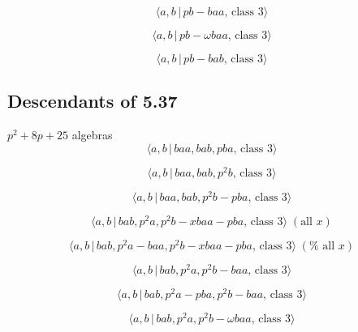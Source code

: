 \documentclass[10pt]{article}
\begin{document}
\begin{equation}
\langle a,b\,|\,pb-baa,\,\text{class }3\rangle  \tag{7.3}
\end{equation}

\begin{equation}
\langle a,b\,|\,pb-\omega baa,\,\text{class }3\rangle  \tag{7.4}
\end{equation}

\begin{equation}
\langle a,b\,|\,pb-bab,\,\text{class }3\rangle  \tag{7.5}
\end{equation}

\subsection{Descendants of 5.37}

$p^{2}+8p+25$ algebras%
\begin{equation}
\langle a,b\,|\,baa,bab,pba,\,\text{class }3\rangle  \tag{7.6}
\end{equation}

\begin{equation}
\langle a,b\,|\,baa,bab,p^2b,\,\text{class }3\rangle  \tag{7.7}
\end{equation}

\begin{equation}
\langle a,b\,|\,baa,bab,p^2b-pba,\,\text{class }3\rangle  \tag{7.8}
\end{equation}

\begin{equation}
\langle a,b\,|\,bab,p^2a,p^2b-xbaa-pba,\,\text{class }3\rangle \;(\text{all }%
x)  \tag{7.9}
\end{equation}

\begin{equation}
\langle a,b\,|\,bab,p^2a-baa,p^2b-xbaa-pba,\,\text{class }3\rangle \;(\text{%
all }x)  \tag{7.10}
\end{equation}

\begin{equation}
\langle a,b\,|\,bab,p^2a,p^2b-baa,\,\text{class }3\rangle  \tag{7.11}
\end{equation}

\begin{equation}
\langle a,b\,|\,bab,p^2a-pba,p^2b-baa,\,\text{class }3\rangle  \tag{7.12}
\end{equation}

\begin{equation}
\langle a,b\,|\,bab,p^{2}a,p^{2}b-\omega baa,\,\text{class }3\rangle 
\tag{7.13}
\end{equation}
\end{document}

